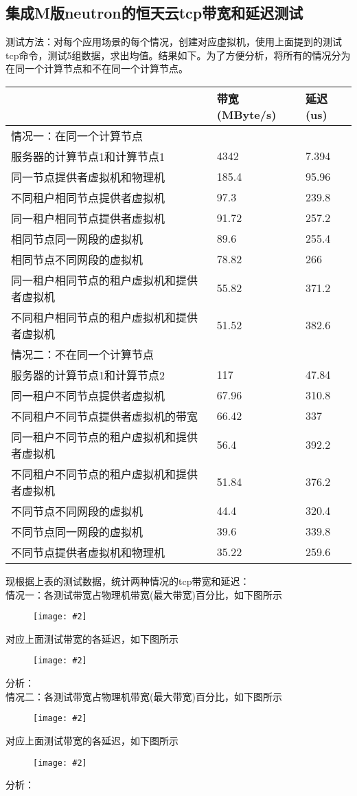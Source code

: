 \documentclass[a4paper,left=1.5cm,right=1.5cm,11pt]{article}
\newcommand{\sizedfic}[2]{\begin{figure}[H]
		\center
		\texttt{[image: \#2]}
	\end{figure}}
\begin{document}
\subsection{集成M版neutron的恒天云tcp带宽和延迟测试}
测试方法：对每个应用场景的每个情况，创建对应虚拟机，使用上面提到的测试tcp命令，测试5组数据，求出均值。结果如下。为了方便分析，将所有的情况分为在同一个计算节点和不在同一个计算节点。
\begin{center}
\begin{tabular}[c]{|l|l|l|}
\hline
 &  带宽(MByte/s)&延迟(us) \\
\hline
 情况一：在同一个计算节点 &  &\\
\hline
服务器的计算节点1和计算节点1 & 4342&7.394 \\
\hline
 同一节点提供者虚拟机和物理机& 185.4&95.96 \\
 \hline
 不同租户相同节点提供者虚拟机& 97.3&239.8 \\
\hline
 同一租户相同节点提供者虚拟机 & 91.72&257.2 \\
 \hline
 相同节点同一网段的虚拟机& 89.6&255.4 \\
 \hline
 相同节点不同网段的虚拟机&  78.82&266\\
 \hline
 同一租户相同节点的租户虚拟机和提供者虚拟机& 55.82&371.2 \\
 \hline
 不同租户相同节点的租户虚拟机和提供者虚拟机& 51.52&382.6 \\
 \hline
 \hline

 情况二：不在同一个计算节点&  &\\
 \hline
 服务器的计算节点1和计算节点2& 117&47.84 \\
 \hline
 同一租户不同节点提供者虚拟机 & 67.96&310.8 \\
 \hline
 不同租户不同节点提供者虚拟机的带宽& 66.42&337 \\
 \hline
 同一租户不同节点的租户虚拟机和提供者虚拟机& 56.4&392.2 \\
 \hline
 不同租户不同节点的租户虚拟机和提供者虚拟机& 51.84&376.2 \\
 \hline
 不同节点不同网段的虚拟机&  44.4&320.4\\
 \hline
 不同节点同一网段的虚拟机&  39.6&339.8\\
 \hline
 不同节点提供者虚拟机和物理机& 35.22&259.6 \\
\hline
\end{tabular}
\end{center}

现根据上表的测试数据，统计两种情况的tcp带宽和延迟：\\
情况一：各测试带宽占物理机带宽(最大带宽)百分比，如下图所示\\
\sizedfic{0.9}{tcp_bw_1.png}
对应上面测试带宽的各延迟，如下图所示\\
\sizedfic{0.9}{tcp_lat_1.png}
分析：\\
情况二：各测试带宽占物理机带宽(最大带宽)百分比，如下图所示\\
\sizedfic{0.9}{tcp_bw_2.png}
对应上面测试带宽的各延迟，如下图所示\\
\sizedfic{0.9}{tcp_lat_2.png}
分析：\\
\end{document}
